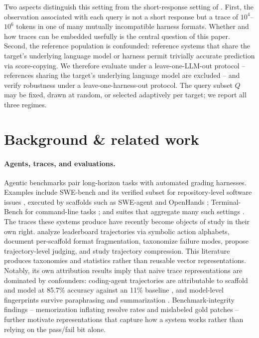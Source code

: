 \documentclass{article}
\begin{document}
Two aspects distinguish this setting from the short-response setting of \citet{helm2026query}.
First, the observation associated with each query is not a short response but a trace of $10^{4}$--$10^{6}$ tokens in one of many mutually incompatible harness formats.
Whether and how traces can be embedded usefully is the central question of this paper.
Second, the reference population is confounded: reference systems that share the target's underlying language model or harness permit trivially accurate prediction via score-copying.
We therefore evaluate under a leave-one-LLM-out protocol -- references sharing the target's underlying language model are excluded -- and verify robustness under a leave-one-harness-out protocol.
The query subset $Q$ may be fixed, drawn at random, or selected adaptively per target; we report all three regimes.

\section{Background \& related work}
\label{sec:related}

\paragraph{Agents, traces, and evaluations.}
Agentic benchmarks pair long-horizon tasks with automated grading harnesses.
Examples include SWE-bench and its verified subset for repository-level software issues \citep{jimenez2024swebench, openai2024verified}, executed by scaffolds such as SWE-agent \citep{yang2024sweagent} and OpenHands \citep{wang2025openhands}; Terminal-Bench for command-line tasks \citep{tbench2026}; and suites that aggregate many such settings \citep{kapoor2025hal}.
The traces these systems produce have recently become objects of study in their own right.
\citet{mehtiyev2026beyond} analyze leaderboard trajectories via symbolic action alphabets, \citet{shu2026traceprobe} document per-scaffold format fragmentation, \citet{cemri2025mast} taxonomize failure modes, \citet{zhuge2025agentjudge} propose trajectory-level judging, and \citet{xiao2025agentdiet} study trajectory compression.
This literature produces taxonomies and statistics rather than reusable vector representations.
Notably, its own attribution results imply that naive trace representations are dominated by confounders: coding-agent trajectories are attributable to scaffold and model at 85.7\% accuracy against an 11\% baseline \citep{oderinwale2026trajectories}, and model-level fingerprints survive paraphrasing and summarization \citep{sun2025idiosyncrasies, wu2026dna}.
Benchmark-integrity findings -- memorization inflating resolve rates \citep{liang2025illusion} and mislabeled gold patches \citep{yu2025utboost} -- further motivate representations that capture how a system works rather than relying on the pass/fail bit alone.
\end{document}
